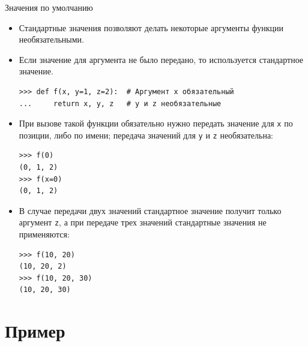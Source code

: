 \documentclass[aspectratio=169, mathserif]{beamer}%
\begin{document}
\begin{frame}[fragile]{Значения по умолчанию}
\scriptsize
\begin{itemize}
\item Стандартные значения позволяют делать некоторые аргументы функции необязательными. 
\item Если значение для аргумента не было передано, то используется стандартное значение.

\begin{verbatim}
>>> def f(x, y=1, z=2):  # Аргумент x обязательный
...     return x, y, z   # y и z необязательные
\end{verbatim}

\item При вызове такой функции обязательно нужно передать значение для \texttt{x} по позиции, либо по имени;  передача значений для \texttt{y} и \texttt{z} необязательна:

\begin{verbatim}
>>> f(0)
(0, 1, 2)
>>> f(x=0)
(0, 1, 2)
\end{verbatim}

\item В случае передачи двух значений стандартное значение получит только аргумент \texttt{z}, а при передаче трех значений стандартные значения не применяются:
\begin{verbatim}
>>> f(10, 20)
(10, 20, 2)
>>> f(10, 20, 30)
(10, 20, 30)
\end{verbatim}
\end{itemize}
\vfill
\end{frame}

\section{Пример}
\sectionframe
\end{document}
